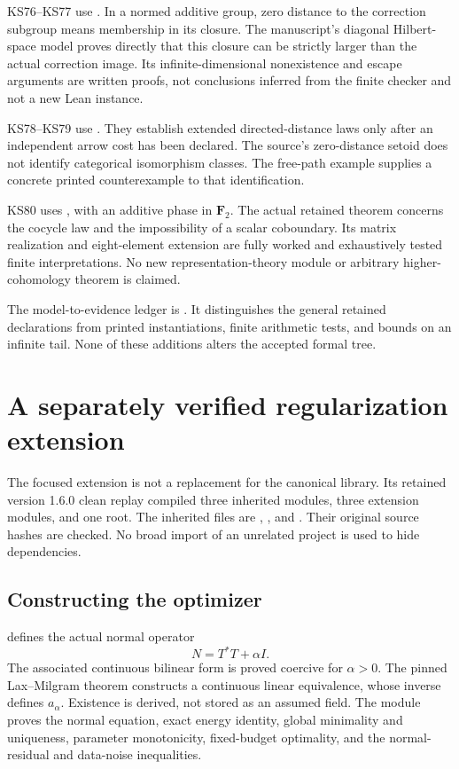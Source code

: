 \documentclass[11pt]{article}
\begin{document}
KS76--KS77 use . In a normed additive group, zero distance to the correction subgroup means membership in its closure. The manuscript's diagonal Hilbert-space model proves directly that this closure can be strictly larger than the actual correction image. Its infinite-dimensional nonexistence and escape arguments are written proofs, not conclusions inferred from the finite checker and not a new Lean instance.

KS78--KS79 use . They establish extended directed-distance laws only after an independent arrow cost has been declared. The source's zero-distance setoid does not identify categorical isomorphism classes. The free-path example supplies a concrete printed counterexample to that identification.

KS80 uses , with an additive phase in \(\mathbf F_2\). The actual retained theorem concerns the cocycle law and the impossibility of a scalar coboundary. Its matrix realization and eight-element extension are fully worked and exhaustively tested finite interpretations. No new representation-theory module or arbitrary higher-cohomology theorem is claimed.

The model-to-evidence ledger is . It distinguishes the general retained declarations from printed instantiations, finite arithmetic tests, and bounds on an infinite tail. None of these additions alters the accepted formal tree.

\section{A separately verified regularization extension}
The focused extension is not a replacement for the canonical library. Its retained version 1.6.0 clean replay compiled three inherited modules, three extension modules, and one root. The inherited files are , , and . Their original source hashes are checked. No broad import of an unrelated project is used to hide dependencies.

\subsection{Constructing the optimizer}
 defines the actual normal operator
\[
 N=T^*T+\alpha I.
\]
The associated continuous bilinear form is proved coercive for $\alpha>0$. The pinned Lax--Milgram theorem constructs a continuous linear equivalence, whose inverse defines $a_\alpha$. Existence is derived, not stored as an assumed field. The module proves the normal equation, exact energy identity, global minimality and uniqueness, parameter monotonicity, fixed-budget optimality, and the normal-residual and data-noise inequalities.
\end{document}
